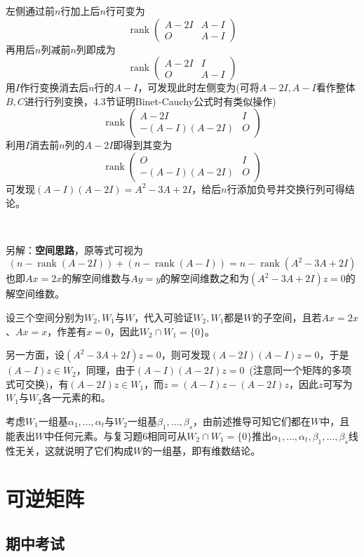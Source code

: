 \documentclass[a4paper,UTF8,fontset=windows]{ctexart}
\DeclareMathOperator{\rank}{rank}
\newcommand*{\note}{\noindent *}
\begin{document}
\begin{enumerate}
\begin{enumerate}[(1)]
        左侧通过前$n$行加上后$n$行可变为
        $$\rank\begin{pmatrix}A-2I&A-I\\O&A-I\end{pmatrix}$$
        再用后$n$列减前$n$列即成为
        $$\rank\begin{pmatrix}A-2I&I\\O&A-I\end{pmatrix}$$
        用$I$作行变换消去后$n$行的$A-I$，可发现此时左侧变为(可将$A-2I,A-I$看作整体$B,C$进行行列变换，4.3节证明Binet-Cauchy公式时有类似操作)
        $$\rank\begin{pmatrix}A-2I&I\\-(A-I)(A-2I)&O\end{pmatrix}$$
        利用$I$消去前$n$列的$A-2I$即得到其变为
        $$\rank\begin{pmatrix}O&I\\-(A-I)(A-2I)&O\end{pmatrix}$$
        可发现$(A-I)(A-2I)=A^2-3A+2I$，给后$n$行添加负号并交换行列可得结论。

        \

        \note 另解：\textbf{空间思路}，原等式可视为
        $$(n-\rank(A-2I))+(n-\rank(A-I))=n-\rank(A^2-3A+2I)$$
        也即$Ax=2x$的解空间维数与$Ay=y$的解空间维数之和为$(A^2-3A+2I)z=0$的解空间维数。

        设三个空间分别为$W_2,W_1$与$W$，代入可验证$W_2,W_1$都是$W$的子空间，且若$Ax=2x$、$Ax=x$，作差有$x=0$，因此$W_2\cap W_1=\{0\}$。

        另一方面，设$(A^2-3A+2I)z=0$，则可发现$(A-2I)(A-I)z=0$，于是$(A-I)z\in W_2$，同理，由于$(A-I)(A-2I)z=0$\ (注意同一个矩阵的多项式可交换)，有$(A-2I)z\in W_1$，而$z=(A-I)z-(A-2I)z$，因此$z$可写为$W_1$与$W_2$各一元素的和。

        考虑$W_1$一组基$\alpha_1,\dots,\alpha_t$与$W_2$一组基$\beta_1,\dots,\beta_s$，由前述推导可知它们都在$W$中，且能表出$W$中任何元素。与复习题6相同可从$W_2\cap W_1=\{0\}$推出$\alpha_1,\dots,\alpha_t,\beta_1,\dots,\beta_s$线性无关，这就说明了它们构成$W$的一组基，即有维数结论。
    \end{enumerate}
\end{enumerate}

\section{可逆矩阵}
\subsection{期中考试}
\end{document}
